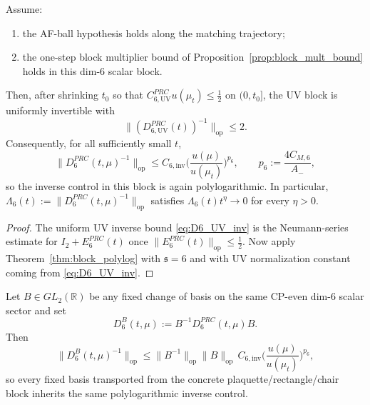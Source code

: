 \begin{theorem}\label{thm:D6_block}
Assume:
\begin{enumerate}[label=(\roman*),leftmargin=2.3em]
\item the AF-ball hypothesis holds along the matching trajectory;
\item the one-step block multiplier bound of Proposition~\ref{prop:block_mult_bound} holds in this dim-$6$ scalar block.
\end{enumerate}
Then, after shrinking $t_0$ so that $C_{6,\mathrm{UV}}^{PRC}u(\mu_t)\le \tfrac12$ on $(0,t_0]$, the UV block is uniformly invertible with
\begin{equation}\label{eq:D6_UV_inv}
\|(D_{6,\mathrm{UV}}^{PRC}(t))^{-1}\|_{\mathrm{op}}\le 2.
\end{equation}
Consequently, for all sufficiently small $t$,
\begin{equation}\label{eq:D6_polylog}
\|D_6^{PRC}(t,\mu)^{-1}\|_{\mathrm{op}}
\le
C_{6,\mathrm{inv}}
\Big(\frac{u(\mu)}{u(\mu_t)}\Big)^{p_6},
\qquad
p_6:=\frac{4C_{M,6}}{A_-},
\end{equation}
so the inverse control in this block is again polylogarithmic.
In particular, $\Lambda_6(t):=\|D_6^{PRC}(t,\mu)^{-1}\|_{\mathrm{op}}$ satisfies $\Lambda_6(t)t^\eta\to 0$ for every $\eta>0$.
\end{theorem}

\begin{proof}
The uniform UV inverse bound \eqref{eq:D6_UV_inv} is the Neumann-series estimate for $I_2+E_{6}^{PRC}(t)$ once $\|E_{6}^{PRC}(t)\|_{\mathrm{op}}\le \tfrac12$.
Now apply Theorem~\ref{thm:block_polylog} with $\mathfrak s=6$ and with UV normalization constant coming from \eqref{eq:D6_UV_inv}.
\end{proof}

\begin{corollary}\label{cor:D6_basis_transfer}
Let $B\in GL_2(\mathbb R)$ be any fixed change of basis on the same CP-even dim-$6$ scalar sector and set
\[
D_6^{B}(t,\mu):=B^{-1}D_6^{PRC}(t,\mu)B.
\]
Then
\[
\|D_6^{B}(t,\mu)^{-1}\|_{\mathrm{op}}
\le
\|B^{-1}\|_{\mathrm{op}}\|B\|_{\mathrm{op}}\,C_{6,\mathrm{inv}}
\Big(\frac{u(\mu)}{u(\mu_t)}\Big)^{p_6},
\]
so every fixed basis transported from the concrete plaquette/rectangle/chair block inherits the same polylogarithmic inverse control.
\end{corollary}

